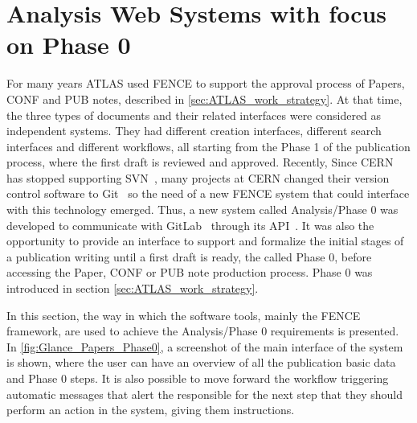 
\section{Analysis Web Systems with focus on Phase 0}%
\label{sec:Analysis_and_paper_phases}

For many years ATLAS used FENCE to support the approval process of Papers, CONF and PUB notes, described in \cref{sec:ATLAS_work_strategy}.
At that time, the three types of documents and their related interfaces were considered as independent systems.
They had different creation interfaces, different search interfaces and different workflows, all starting from the Phase 1 of the publication process, where the first draft is reviewed and approved.
Recently, Since CERN has stopped supporting SVN~\cite{svn}, many projects at CERN changed their version control software to Git~\cite{git} so the need of a new FENCE system that could interface with this technology emerged.
Thus, a new system called Analysis/Phase 0 was developed to communicate with GitLab~\cite{gitlab} through its API~\cite{rest_api}. It was also the opportunity to provide an interface to support and formalize the initial stages of a publication writing until a first draft is ready, the called Phase 0, before accessing the Paper, CONF or PUB note production process. Phase 0 was introduced in section \cref{sec:ATLAS_work_strategy}.

In this section, the way in which the software tools, mainly the FENCE framework, are used to achieve the Analysis/Phase 0 requirements is presented.
In \cref{fig:Glance_Papers_Phase0}, a screenshot of the main interface of the system is shown, where the user can have an overview of all the publication basic data and Phase 0 steps.
It is also possible to move forward the workflow triggering automatic messages that alert the responsible for the next step that they should perform an action in the system, giving them instructions.

